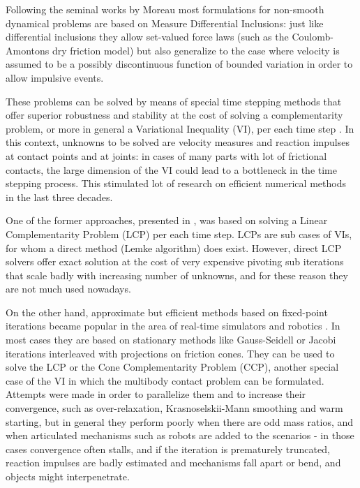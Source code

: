 \documentclass{svproc}
\begin{document}
Following the seminal works by Moreau 
\cite{mor88,Jean1992} 
most formulations for non-smooth dynamical problems are based on Measure Differential Inclusions: just like differential inclusions they allow set-valued force laws (such as the Coulomb-Amontons dry friction model) but also generalize to the case where velocity is assumed to be a possibly discontinuous function of bounded variation in order to allow impulsive events.

These problems can be solved by means of special time stepping methods that offer superior robustness and stability at the cost of solving a complementarity problem, or more in general a Variational Inequality (VI), per each time step
 \cite{acary2008numerical}. 
In this context, unknowns to be solved are velocity measures and reaction impulses at contact points and at joints: in cases of many parts with lot of frictional contacts, the large dimension of the VI could lead to a bottleneck in the time stepping process. This stimulated lot of research on efficient numerical methods in the last three decades.  

One of the former approaches, presented in 
\cite{StTr95}  %
, was based on solving a Linear Complementarity Problem (LCP) per each time step. LCPs are sub cases of VIs, for whom a direct method (Lemke algorithm) does exist. However, direct LCP solvers offer exact solution at the cost of very expensive pivoting sub iterations that scale badly with increasing number of unknowns, and for these reason they are not much used nowadays.

On the other hand, approximate but efficient methods based on fixed-point iterations became popular in the area of real-time simulators and robotics \cite{Bender2014}.
In most cases they are based on stationary methods like Gauss-Seidell or Jacobi iterations interleaved with projections on friction cones. They can be used to solve the LCP or the Cone Complementarity Problem (CCP), another special case of the VI in which the multibody contact problem can be formulated.
Attempts were made in order to parallelize them and to increase their convergence, such as over-relaxation, Krasnoselskii-Mann smoothing and warm starting, 
\cite{massSplittingRichard2012,TasoraAnitescuCMAME10} %
but in general they perform poorly when there are odd mass ratios, and when articulated mechanisms such as robots are added to the scenarios - in those cases convergence often stalls, and if the iteration is prematurely truncated, reaction impulses are badly estimated and mechanisms fall apart or bend, and objects might interpenetrate. 
\end{document}
